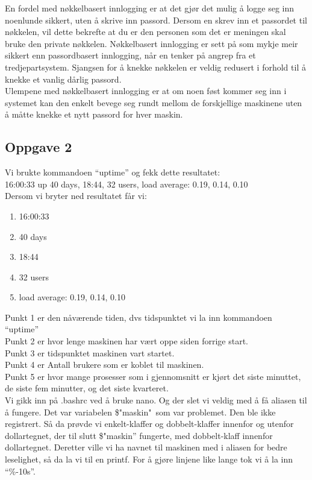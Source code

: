 \documentclass[a4paper, norsk, 12pt]{article}
\begin{document}
En fordel med nøkkelbasert innlogging er at det gjør det mulig å logge seg inn noenlunde sikkert, uten å skrive inn passord. Dersom en skrev inn et passordet til nøkkelen, vil dette bekrefte at du er den personen som det er meningen skal bruke den private nøkkelen. Nøkkelbasert innlogging er sett på som mykje meir sikkert enn passordbasert innlogging, når en tenker på angrep fra et tredjepartsystem. Sjangsen for å knekke nøkkelen er veldig redusert i forhold til å knekke et vanlig dårlig passord.\\

Ulempene med nøkkelbasert innlogging er at om noen føst kommer seg inn i systemet kan den enkelt bevege seg rundt mellom de forskjellige maskinene uten å måtte knekke et nytt passord for hver maskin.

\subsection*{Oppgave 2}
Vi brukte kommandoen “uptime” og fekk dette resultatet:\\
16:00:33 up 40 days, 18:44, 32 users,  load average: 0.19, 0.14, 0.10\\

Dersom vi bryter ned resultatet får vi:\\
\begin{enumerate}
\item 16:00:33
\item 40 days
\item 18:44
\item 32 users
\item load average: 0.19, 0.14, 0.10
\end{enumerate}

Punkt 1 er den nåværende tiden, dvs tidspunktet vi la inn kommandoen “uptime”\\
Punkt 2 er hvor lenge maskinen har vært oppe siden forrige start.\\
Punkt 3 er tidspunktet maskinen vart startet.\\
Punkt 4 er Antall brukere som er koblet til maskinen.\\
Punkt 5 er hvor mange prosesser som i gjennomsnitt er kjørt det siste minuttet, de siste fem minutter, og det siste kvarteret.\\


Vi gikk inn på .bashrc ved å bruke nano. Og der slet vi veldig med å få aliasen til å fungere. Det var variabelen \$"maskin"\ som var problemet. Den ble ikke registrert. Så da prøvde vi enkelt-klaffer og dobbelt-klaffer innenfor og utenfor dollartegnet, der til slutt \$"maskin” fungerte, med dobbelt-klaff innenfor dollartegnet. Deretter ville vi ha navnet til maskinen med i aliasen for bedre leselighet, så da la vi til en printf. For å gjøre linjene like lange tok vi å la inn “\%-10s”. \\
\end{document}
